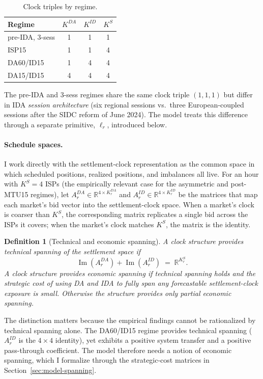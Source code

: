 \documentclass[11pt]{article}
\newtheorem{definition}{Definition}
\begin{document}
\begin{table}[h]
\centering
\caption{Clock triples by regime.}
\label{tab:regimes}
\begin{tabular}{lccc}
\toprule
Regime & $K^{DA}$ & $K^{ID}$ & $K^{S}$ \\
\midrule
pre-IDA, 3-sess  & 1 & 1 & 1 \\
ISP15            & 1 & 1 & 4 \\
DA60/ID15        & 1 & 4 & 4 \\
DA15/ID15        & 4 & 4 & 4 \\
\bottomrule
\end{tabular}
\end{table}

The pre-IDA and 3-sess regimes share the same clock triple $(1,1,1)$ but differ in IDA \emph{session architecture} (six regional sessions vs.\ three European-coupled sessions after the SIDC reform of June 2024). The model treats this difference through a separate primitive, $\ell_r$, introduced below.

\paragraph{Schedule spaces.} I work directly with the settlement-clock representation as the common space in which scheduled positions, realized positions, and imbalances all live. For an hour with $K^{S}=4$ ISPs (the empirically relevant case for the asymmetric and post-MTU15 regimes), let $A^{DA}_r \in \mathbb{R}^{4 \times K^{DA}_r}$ and $A^{ID}_r \in \mathbb{R}^{4 \times K^{ID}_r}$ be the matrices that map each market's bid vector into the settlement-clock space. When a market's clock is coarser than $K^{S}$, the corresponding matrix replicates a single bid across the ISPs it covers; when the market's clock matches $K^{S}$, the matrix is the identity.

\begin{definition}[Technical and economic spanning]
A clock structure provides \emph{technical spanning} of the settlement space if
\[
\operatorname{Im}(A^{DA}_r) + \operatorname{Im}(A^{ID}_r) \;=\; \mathbb{R}^{K^{S}_r}.
\]
A clock structure provides \emph{economic spanning} if technical spanning holds and the strategic cost of using DA and IDA to fully span any forecastable settlement-clock exposure is small. Otherwise the structure provides only partial economic spanning.
\end{definition}

The distinction matters because the empirical findings cannot be rationalized by technical spanning alone. The DA60/ID15 regime provides technical spanning ($A^{ID}_r$ is the $4\times 4$ identity), yet exhibits a positive system transfer and a positive pass-through coefficient. The model therefore needs a notion of economic spanning, which I formalize through the strategic-cost matrices in Section~\ref{sec:model-spanning}.
\end{document}
